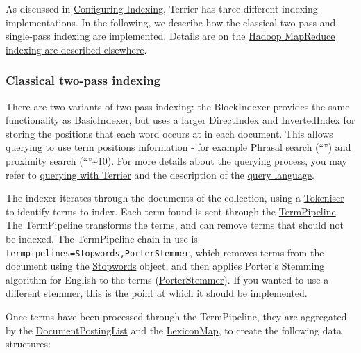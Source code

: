 As discussed in \href{configure_indexing.html}{Configuring Indexing},
Terrier has three different indexing implementations. In the following,
we describe how the classical two-pass and single-pass indexing are
implemented. Details are on the \href{hadoop_indexing.html}{Hadoop
MapReduce indexing are described elsewhere}.

\subsubsection{Classical two-pass
indexing}\label{classical-two-pass-indexing}

There are two variants of two-pass indexing: the BlockIndexer provides
the same functionality as BasicIndexer, but uses a larger DirectIndex
and InvertedIndex for storing the positions that each word occurs at in
each document. This allows querying to use term positions information -
for example Phrasal search (``'') and proximity search
(``''\textasciitilde{}10). For more details about the querying process,
you may refer to \href{extend_retrieval.html}{querying with Terrier} and
the description of the \href{querylanguage.html}{query language}.

The indexer iterates through the documents of the collection, using a
\href{javadoc/org/terrier/indexing/tokenisation/Tokeniser.html}{Tokeniser}
to identify terms to index. Each term found is sent through the
\href{javadoc/org/terrier/terms/TermPipeline.html}{TermPipeline}. The
TermPipeline transforms the terms, and can remove terms that should not
be indexed. The TermPipeline chain in use is
\texttt{termpipelines=Stopwords,PorterStemmer}, which removes terms from
the document using the
\href{javadoc/org/terrier/terms/Stopwords.html}{Stopwords} object, and
then applies Porter's Stemming algorithm for English to the terms
(\href{javadoc/org/terrier/terms/PorterStemmer.html}{PorterStemmer}). If
you wanted to use a different stemmer, this is the point at which it
should be implemented.

Once terms have been processed through the TermPipeline, they are
aggregated by the
\href{javadoc/org/terrier/structures/indexing/DocumentPostingList.html}{DocumentPostingList}
and the
\href{javadoc/org/terrier/structures/indexing/LexiconMap.html}{LexiconMap},
to create the following data structures:

